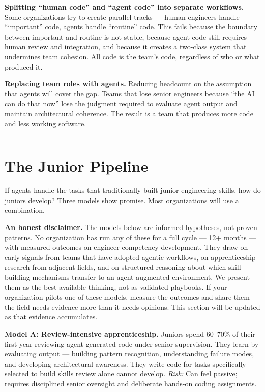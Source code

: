 \documentclass[
  a4paper,
  DIV=11,
  numbers=noendperiod]{scrreprt}
\begin{document}
\textbf{Splitting ``human code'' and ``agent code'' into separate
workflows.} Some organizations try to create parallel tracks --- human
engineers handle ``important'' code, agents handle ``routine'' code.
This fails because the boundary between important and routine is not
stable, because agent code still requires human review and integration,
and because it creates a two-class system that undermines team cohesion.
All code is the team's code, regardless of who or what produced it.

\textbf{Replacing team roles with agents.} Reducing headcount on the
assumption that agents will cover the gap. Teams that lose senior
engineers because ``the AI can do that now'' lose the judgment required
to evaluate agent output and maintain architectural coherence. The
result is a team that produces more code and less working software.

\begin{center}\rule{0.5\linewidth}{0.5pt}\end{center}

\section{The Junior Pipeline}\label{the-junior-pipeline}

If agents handle the tasks that traditionally built junior engineering
skills, how do juniors develop? Three models show promise. Most
organizations will use a combination.

\textbf{An honest disclaimer.} The models below are informed hypotheses,
not proven patterns. No organization has run any of these for a full
cycle --- 12+ months --- with measured outcomes on engineer competency
development. They draw on early signals from teams that have adopted
agentic workflows, on apprenticeship research from adjacent fields, and
on structured reasoning about which skill-building mechanisms transfer
to an agent-augmented environment. We present them as the best available
thinking, not as validated playbooks. If your organization pilots one of
these models, measure the outcomes and share them --- the field needs
evidence more than it needs opinions. This section will be updated as
that evidence accumulates.

\textbf{Model A: Review-intensive apprenticeship.} Juniors spend
60--70\% of their first year reviewing agent-generated code under senior
supervision. They learn by evaluating output --- building pattern
recognition, understanding failure modes, and developing architectural
awareness. They write code for tasks specifically selected to build
skills review alone cannot develop. \emph{Risk:} Can feel passive;
requires disciplined senior oversight and deliberate hands-on coding
assignments.
\end{document}
